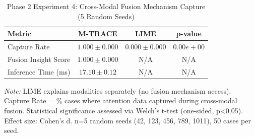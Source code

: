 
\begin{table}[h]
\centering
\caption{Phase 2 Experiment 4: Cross-Modal Fusion Mechanism Capture (5 Random Seeds)}
\label{tab:experiment4_fusion}
\begin{tabular}{lccc}
\toprule
\textbf{Metric} & \textbf{M-TRACE} & \textbf{LIME} & \textbf{p-value} \\
\midrule
Capture Rate & $1.000 \pm 0.000$ & $0.000 \pm 0.000$ & $0.00e+00$ \\
\midrule
Fusion Insight Score & $1.000 \pm 0.000$ & N/A & N/A \\
\midrule
Inference Time (ms) & $17.10 \pm 0.12$ & N/A & N/A \\
\bottomrule
\end{tabular}
\begin{flushleft}
\small
\textit{Note:} LIME explains modalities separately (no fusion mechanism access).
Capture Rate = \% cases where attention data captured during cross-modal fusion.
Statistical significance assessed via Welch's t-test (one-sided, p<0.05). Effect size: Cohen's d.
n=5 random seeds (42, 123, 456, 789, 1011), 50 cases per seed.
\end{flushleft}
\end{table}
